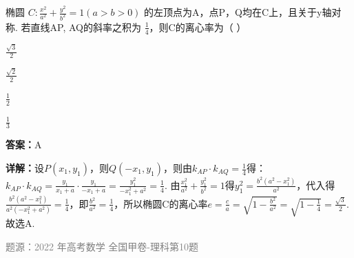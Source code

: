 \begin{question}
椭圆 $C:\frac{x^2}{a^2}+\frac{y^2}{b^2}=1(a>b>0)$ 的左顶点为A，点P，Q均在C上，且关于y轴对称. 若直线AP, AQ的斜率之积为 $\frac{1}{4}$，则C的离心率为（ ）
\begin{choices}
\item $\frac{\sqrt{3}}{2}$
\item $\frac{\sqrt{2}}{2}$
\item $\frac{1}{2}$
\item $\frac{1}{3}$
\end{choices}
\begin{solution}
\textbf{答案：}A

\textbf{详解：}设$P(x_1,y_1)$，则$Q(-x_1,y_1)$，则由$k_{AP}\cdot k_{AQ}=\frac{1}{4}$得：$k_{AP}\cdot k_{AQ}=\frac{y_1}{x_1+a}\cdot\frac{y_1}{-x_1+a}=\frac{y_1^2}{-x_1^2+a^2}=\frac{1}{4}$. 由$\frac{x_1^2}{a^2}+\frac{y_1^2}{b^2}=1$得$y_1^2=\frac{b^2(a^2-x_1^2)}{a^2}$，代入得$\frac{b^2(a^2-x_1^2)}{a^2(-x_1^2+a^2)}=\frac{1}{4}$，即$\frac{b^2}{a^2}=\frac{1}{4}$，所以椭圆C的离心率$e=\frac{c}{a}=\sqrt{1-\frac{b^2}{a^2}}=\sqrt{1-\frac{1}{4}}=\frac{\sqrt{3}}{2}$. 故选A.

\textcolor{gray}{\footnotesize 题源：2022 年高考数学 全国甲卷-理科第10题}
\end{solution}
\end{question}

